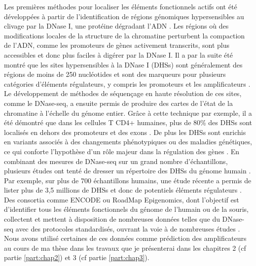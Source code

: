 Les premières méthodes pour localiser les éléments fonctionnels actifs ont été développées à partir de l’identification de régions génomiques hypersensibles au clivage par la DNase I, une protéine dégradant l’ADN \citep{keene_dnase_1981, mcghee_200_1981}. Les régions où des modifications locales de la structure de la chromatine perturbent la compaction de l’ADN, comme les promoteurs de gènes activement transcrits, sont plus accessibles et donc plus faciles à digérer par la DNase I. Il a par la suite été montré que les sites hypersensibles à la DNase I (DHSs) sont généralement des régions de moins de 250 nucléotides et sont des marqueurs pour plusieurs catégories d'éléments régulateurs, y compris les promoteurs et les \glspl{amplificateur} \citep{felsenfeld_controlling_2003}. Le développement de méthodes de séquençage en haute résolution de ces sites, comme le DNase-seq, a ensuite permis de produire des cartes de l’état de la chromatine à l’échelle du génome entier. Grâce à cette technique par exemple, il a été démontré que dans les cellules T CD4+ humaines, plus de 80\% des DHSs sont localisés en dehors des promoteurs et des exons \citep{boyle_high-resolution_2008}. De plus les DHSs sont enrichis en variants associés à des changements phénotypiques ou des maladies génétiques, ce qui conforte l’hypothèse d’un rôle majeur dans la régulation des gènes \citep{maurano_systematic_2012}. En combinant des mesures de DNase-seq sur un grand nombre d'échantillons, plusieurs études ont tenté de dresser un répertoire des DHSs du génome humain \citep{thurman_accessible_2012, meuleman_index_2020}. Par exemple, sur plus de 700 échantillons humains, une étude récente a permis de lister plus de 3,5 millions de DHSs et donc de potentiels éléments régulateurs \citep{meuleman_index_2020}. Des consortia comme ENCODE ou RoadMap Epigenomics, dont l’objectif est d’identifier tous les éléments fonctionnels du génome de l’humain ou de la souris, collectent et mettent à disposition de nombreuses données telles que du DNase-seq avec des protocoles standardisés, ouvrant la voie à de nombreuses études \citep{davis_encyclopedia_2018, roadmap_epigenomics_consortium_integrative_2015}. Nous avons utilisé certaines de ces données comme prédiction des \glspl{amplificateur} au cours de ma thèse dans les travaux que je présenterai dans les chapitres 2 (cf partie \ref{part:chap2}) et 3 (cf partie \ref{part:chap3}). \\


